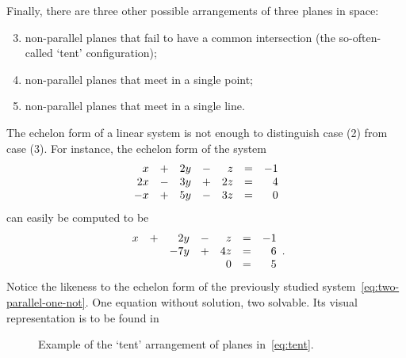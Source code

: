 Finally, there are three other possible arrangements of three planes in space:
\begin{enumerate}
 \setcounter{enumi}{2}
 \item non-parallel planes that fail to have a common intersection (the
  so-often-called `tent' configuration);
 \item non-parallel planes that meet in a single point;
 \item non-parallel planes that meet in a single line.
\end{enumerate}
The echelon form of a linear system is not enough to distinguish case (2) from
case (3). For instance, the echelon form of the system
\begin{equation}
 \label{eq:tent}
 \begin{array}{r c r c r c r}
  x & + & 2y & - & z & = & -1\\
  2x & - & 3y & + & 2z & = & 4\\
  -x & + & 5y & - & 3z & = & 0
 \end{array}
\end{equation}
can easily be computed to be
\[
 \begin{array}{r c r c r c r}
  x & + & 2y & - & z & = & -1\\
    & & -7y & + & 4z & = & 6\\
    & & & & 0 & = & 5
 \end{array}.
\]
Notice the likeness to the echelon form of the previously studied
system~\eqref{eq:two-parallel-one-not}. One equation without solution, two
solvable. Its visual representation is to be found in
\begin{figure}[ht]
 \centering

 \caption{Example of the `tent' arrangement of planes in~\eqref{eq:tent}.}
 \label{fig:tent-configuration}
\end{figure}

